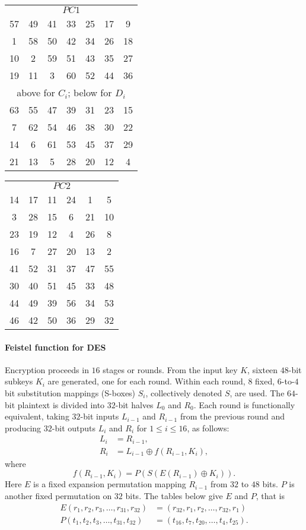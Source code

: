 \documentclass[a4paper, 11pt, openany]{book}
\numberwithin{equation}{section}
\theoremstyle{plain}
\theoremstyle{definition}
\begin{document}
\begin{tabular}{ccccccc}
\multicolumn{7}{c}{$PC1$}\\
57 & 49 & 41 & 33 & 25 & 17 & 9\\
1 & 58 & 50 & 42 & 34 & 26 & 18\\
10 & 2 & 59 & 51 & 43 & 35 & 27\\
19 & 11 & 3 & 60 & 52 & 44 & 36\\
\multicolumn{7}{c}{above for $C_i$; below for $D_i$}\\
63 & 55 & 47 & 39 & 31 & 23 & 15\\
7 & 62 & 54 & 46 & 38 & 30 & 22\\
14 & 6 & 61 & 53 & 45 & 37 & 29\\
21 & 13 & 5 & 28 & 20 & 12 & 4
\end{tabular}
\hfill
\begin{tabular}{cccccc}
\multicolumn{6}{c}{$PC2$}\\
14 & 17 & 11 & 24 & 1 & 5\\
3 & 28 & 15 & 6 & 21 & 10\\
23 & 19 & 12 & 4 & 26 & 8\\
16 & 7 & 27 & 20 & 13 & 2\\
41 & 52 & 31 & 37 & 47 & 55\\
30 & 40 & 51 & 45 & 33 & 48\\
44 & 49 & 39 & 56 & 34 & 53\\
46 & 42 & 50 & 36 & 29 & 32
\end{tabular}



\paragraph{Feistel function for DES}

Encryption proceeds in $16$ stages or rounds. From the input key $K$, sixteen $48$-bit
subkeys $K_i$ are generated, one for each round. Within each round, $8$ fixed, $6$-to-$4$ bit substitution mappings (S-boxes) $S_i$, collectively denoted $S$, are used. The $64$-bit
plaintext is divided into $32$-bit halves $L_0$ and $R_0$. Each round is functionally equivalent, taking $32$-bit inputs $L_{i-1}$ and $R_{i-1}$ from the previous round and producing $32$-bit outputs
$L_i$ and $R_i$ for $1 \le i \le 16$, as follows:
\begin{align*}
    L_i &= R_{i-1},\\
    R_i &= L_{i-1} \oplus f(R_{i-1}, K_i),
\end{align*}
where 
\[
    f(R_{i-1}, K_i) = P( S( E( R_{i-1} ) \oplus K_i ) ).
\]
Here $E$ is a fixed expansion permutation mapping $R_{i-1}$ from $32$ to $48$ bits. $P$ is another fixed permutation on $32$ bits. The tables below give $E$ and $P$, that is 
\begin{align*}
    E(r_1, r_2, r_3, \dots, r_{31}, r_{32}) &= (r_{32}, r_1, r_2, \dots, r_{32}, r_1)\\
    P(t_1, t_2, t_3, \dots, t_{31}, t_{32}) &= (t_{16}, t_7, t_{20}, \dots, t_4, t_{25}). 
\end{align*}
\end{document}
